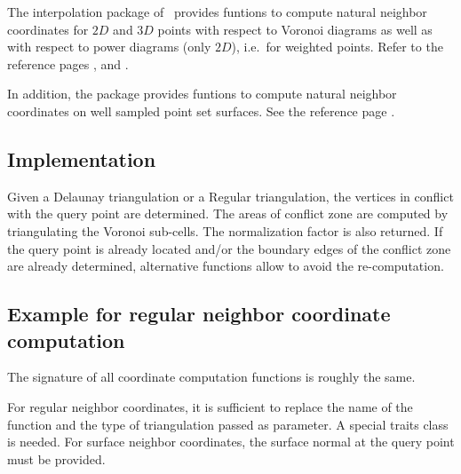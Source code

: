   The interpolation package of \cgal\ provides funtions to compute
  natural neighbor coordinates for $2D$ and $3D$ points with respect
  to Voronoi diagrams as well as with respect to power diagrams (only
  $2D$), i.e.\ for weighted points. Refer to the reference pages
  ,
   and
  .

In addition, the package provides funtions to compute natural neighbor
coordinates on well sampled point set surfaces. See the reference page
.

\subsection{Implementation}
Given a Delaunay triangulation or a Regular triangulation, the
vertices in conflict with the query point are determined. The areas of
conflict zone are computed by triangulating the Voronoi sub-cells. The
normalization factor is also returned. If the query point is already
located and/or the boundary edges of the conflict zone are already
determined, alternative functions allow to avoid the re-computation.

\subsection{Example for regular neighbor coordinate computation}
The signature of all coordinate computation functions is roughly the
same. 

For regular neighbor coordinates, it is sufficient to replace the name
of the function and the type of triangulation passed as parameter. A
special traits class is needed.
For surface neighbor coordinates, the surface normal at the query
point must be provided.
%
